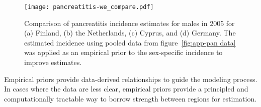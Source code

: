    \begin{figure}[h]
        \begin{center}
            \texttt{[image: pancreatitis-we\_compare.pdf]}
            \caption[Comparison of pancreatitis incidence estimates.]
             {Comparison of pancreatitis incidence estimates
              for males in 2005 for (a) Finland, (b) the Netherlands, (c)
              Cyprus, and (d) Germany.  The estimated incidence using
              pooled data from figure~\ref{fig:app-pan data} was
              applied as an empirical prior to the sex-specific
              incidence to improve estimates.}
            \label{fig:app-pan compare}
        \end{center}
    \end{figure}

Empirical priors provide data-derived relationships to guide the
modeling process.  In cases where the data are less clear, empirical
priors provide a principled and computationally tractable way to
borrow strength between regions for estimation.
